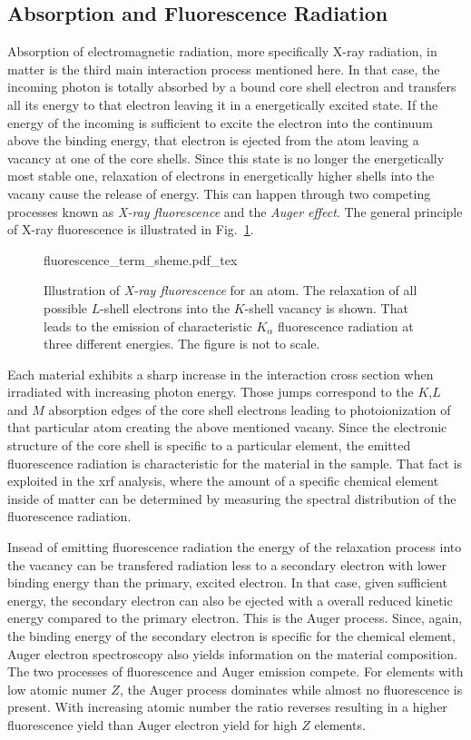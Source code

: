 \subsection{Absorption and Fluorescence Radiation}
Absorption of electromagnetic radiation, more specifically X-ray radiation, in matter is the third main interaction process mentioned here. In that case, the incoming photon is totally absorbed by a bound core shell electron and transfers all its energy to that electron leaving it in a energetically excited state. If the energy of the incoming is sufficient to excite the electron into the continuum above the binding energy, that electron is ejected from the atom leaving a vacancy at one of the core shells. Since this state is no longer the energetically most stable one, relaxation of electrons in energetically higher shells into the vacany cause the release of energy. This can happen through two competing processes known as \emph{X-ray fluorescence} and the \emph{Auger effect}. The general principle of X-ray fluorescence is illustrated in Fig.~\ref{ch_theo:fig_fluorescence_term_sheme}.
\begin{figure}[htb]
    \def\svgwidth{0.5\textwidth}
    {fluorescence_term_sheme.pdf_tex}
    \caption{Illustration of \emph{X-ray fluorescence} for an atom. The relaxation of all possible $L$-shell electrons into the $K$-shell vacancy is shown. That leads to the emission of characteristic $K_\alpha$ fluorescence radiation at three different energies. The figure is not to scale.}
    \label{ch_theo:fig_fluorescence_term_sheme}
\end{figure}

Each material exhibits a sharp increase in the interaction cross section when irradiated with increasing photon energy. Those jumps correspond to the $K$,$L$ and $M$ absorption edges of the core shell electrons leading to photoionization of that particular atom creating the above mentioned vacany. Since the electronic structure of the core shell is specific to a particular element, the emitted fluorescence radiation is characteristic for the material in the sample. That fact is exploited in the \gls{xrf} analysis, where the amount of a specific chemical element inside of matter can be determined by measuring the spectral distribution of the fluorescence radiation.

Insead of emitting fluorescence radiation the energy of the relaxation process into the vacancy can be transfered radiation less to a secondary electron with lower binding energy than the primary, excited electron. In that case, given sufficient energy, the secondary electron can also be ejected with a overall reduced kinetic energy compared to the primary electron. This is the Auger process. Since, again, the binding energy of the secondary electron is specific for the chemical element, Auger electron spectroscopy also yields information on the material composition. The two processes of fluorescence and Auger emission compete. For elements with low atomic numer $Z$, the Auger process dominates while almost no fluorescence is present. With increasing atomic number the ratio reverses resulting in a higher fluorescence yield than Auger electron yield for high $Z$ elements.

